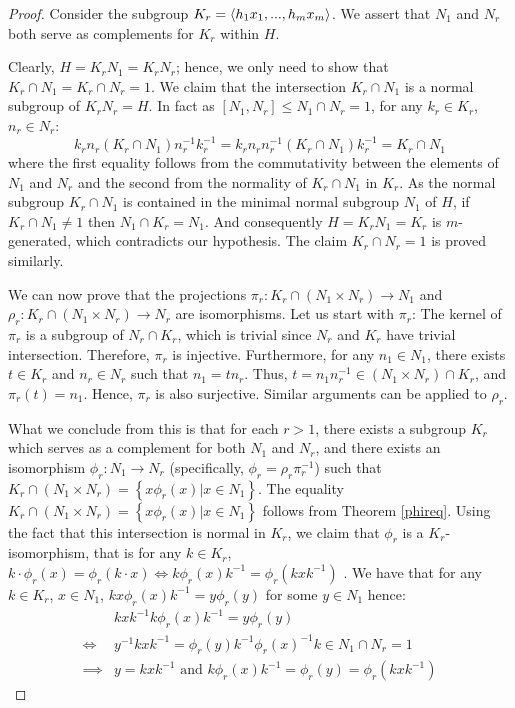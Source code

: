 \begin{proof}
    Consider the subgroup $K_r = \langle h_1x_1,...,h_mx_m \rangle$. We assert that $N_1$ and $N_r$ both serve as complements for $K_r$ within $H$.
    
    Clearly, $H = K_rN_1 = K_rN_r$; hence, we only need to show that $K_r \cap N_1 = K_r \cap N_r = 1$. We claim that the intersection $K_r \cap N_1$ is a normal subgroup of $K_rN_r = H$. In fact as $[N_1, N_r] \le N_1 \cap N_r = 1$, for any $k_r \in K_r$, $n_r \in N_r$:
    $$ 
    k_rn_r(K_r \cap N_1)n_r^{-1}k_r^{-1} = k_rn_rn_r^{-1}(K_r \cap N_1)k_r^{-1} = K_r \cap N_1 
    $$
    where the first equality follows from the commutativity between the elements of $N_1$ and $N_r$ and the second from the normality of $K_r \cap N_1$ in $K_r$.
    As the normal subgroup $K_r \cap N_1$ is contained in the minimal normal subgroup $N_1$ of $H$, if $K_r \cap N_1 \ne 1$ then $N_1 \cap K_r = N_1$. And consequently $H = K_rN_1 = K_r$ is $m$-generated, which contradicts our hypothesis. The claim $K_r \cap N_r = 1$ is proved similarly.

    We can now prove that the projections $\pi_r : K_r \cap (N_1 \times N_r) \rightarrow N_1$ and $\rho_r : K_r \cap (N_1 \times N_r) \rightarrow N_r$ are isomorphisms. 
    Let us start with $\pi_r$: The kernel of $\pi_r$ is a subgroup of $N_r \cap K_r$, which is trivial since $N_r$ and $K_r$ have trivial intersection. Therefore, $\pi_r$ is injective. 
    Furthermore, for any $n_1 \in N_1$, there exists $t \in K_r$ and $n_r \in N_r$ such that $n_1 = tn_r$. Thus, $t = n_1n_r^{-1} \in (N_1 \times N_r) \cap K_r$, and $\pi_r(t) = n_1$. Hence, $\pi_r$ is also surjective.
    Similar arguments can be applied to $\rho_r$.

    What we conclude from this is that for each $r > 1$, there exists a subgroup $K_r$ which serves as a complement for both $N_1$ and $N_r$, and there exists an isomorphism $\phi_r : N_1 \rightarrow N_r$ (specifically, $\phi_r = \rho_r\pi_r^{-1}$) such that $K_r \cap (N_1 \times N_r) = \left\{x\phi_r(x) | x \in N_1\right\}$. 
    The equality $K_r \cap (N_1 \times N_r) = \left\{x\phi_r(x) | x \in N_1\right\}$ follows from Theorem \ref{phireq}.
    Using the fact that this intersection is normal in $K_r$, we claim that $\phi_r$ is a $K_r$-isomorphism, that is for any $k \in K_r$, $k \cdot \phi_r(x) = \phi_r(k \cdot x) \iff k\phi_r(x)k^{-1} = \phi_r(kxk^{-1})$ . We have that for any $k \in K_r$, $x \in N_1$, $kx\phi_r(x)k^{-1} = y\phi_r(y)$ for some $y \in N_1$ hence:
    \begin{align*}
        &kxk^{-1}k\phi_r(x)k^{-1} = y\phi_r(y)\\
        \iff &y^{-1}kxk^{-1} = \phi_r(y)k^{-1}\phi_r(x)^{-1}k \in N_1 \cap N_r = 1\\
        \implies &y = kxk^{-1} \text{ and } k\phi_r(x)k^{-1} = \phi_r(y) = \phi_r(kxk^{-1})
    \end{align*}


\end{proof}
